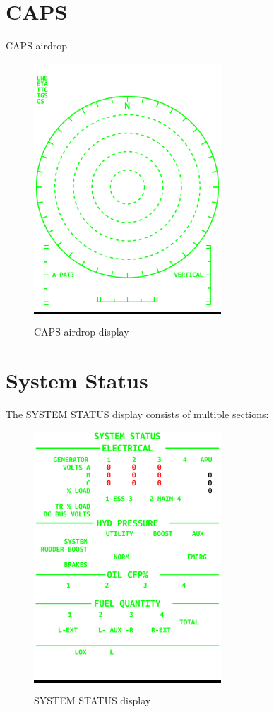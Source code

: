 \newpage
\section{CAPS}
\label{sec:caps-airdrop}

\gls{CAPS-airdrop}

\begin{figure}[h]
  \centering
  \colorbox{black}{\includegraphics[width=7cm]{figures/hdd/CAPS}}
  \caption{\gls{CAPS-airdrop} display}
\end{figure}

\newpage
\section{System Status}

The SYSTEM STATUS display consists of multiple sections:

\begin{figure}[h]
  \centering
  \colorbox{black}{\includegraphics[width=7cm]{figures/hdd/SYSTEM-STATUS}}
  \caption{SYSTEM STATUS display}
\end{figure}

